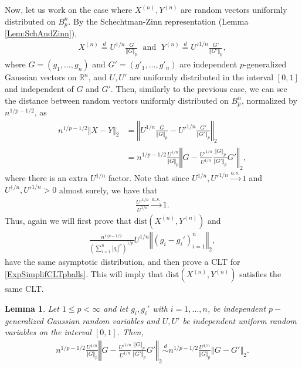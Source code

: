 \documentclass[10pt]{amsart}
\newtheorem{lemma}{Lemma}[section]
\newcounter{theor}
\def\R{\mathbb{R}}
\def\dist{\text{dist}}
\numberwithin{equation}{section}
\begin{document}
Now, let us work on the case where $X^{(n)},Y^{(n)}$ are random vectors uniformly distributed on $B_p^n$. By the Schechtman-Zinn representation (Lemma \ref{Lem:SchAndZinn}), 
\begin{align*}
X^{(n)} \overset{d}{=} U^{1/n} \frac{G}{\Vert G \Vert _p} \; \text{ and } \; Y^{(n)} \overset{d}{=} U'^{1/n} \frac{G'}{\Vert G' \Vert _p},
\end{align*}
where $G=(g_1,...,g_n)$ and $G'=(g'_1,...,g'_n)$ are independent $p$-generalized Gaussian vectors on $\R^n$, and $U,U'$ are uniformly distributed in the interval $[0,1]$ and independent of $G$ and $G'$.
Then, similarly to the previous case, we can see the distance between random vectors uniformly distributed on $B_p^n$, normalized by $n^{1/p - 1/2}$, as
\begin{align*}
n^{1/p - 1/2}\Vert X - Y \Vert _2 & = \left\Vert U^{1/n} \frac{G}{\Vert G \Vert_p} -U'^{1/n} \frac{G'}{\Vert G' \Vert_p} \right\Vert _2 
 \\
 & = n^{1/p - 1/2} \frac{U^{1/n}}{\Vert G \Vert _p} \left\Vert G-  \frac{U'^{1/n}}{U^{1/n}} \frac{\Vert G \Vert_p}{\Vert G' \Vert_p} G' \right\Vert _2 ,
\end{align*}
where there is an extra $U^{1/n}$ factor.
Note that since $U^{1/n}, U'^{1/n} \overset{a.s.}{\to} 1$ and $U^{1/n}, U'^{1/n}>0$ almost surely, we have that
\begin{align*}
\frac{U'^{1/n}}{U^{1/n}} \overset{a.s.}{\to} 1 .
\end{align*}
Thus, again we will first prove that $\dist( X^{(n)} , Y^{(n)} )$ and 
\begin{align}
\label{ExpSimplifCLTpballs}
\frac{n^{1/p-1/2}}{\left(\sum _{i=1}^n \left| g_i  \right|^p \right)^{1/p}} U^{1/n} \left\Vert   \left( g_i -  g_i' \right)_{i=1}^n \right\Vert _2,
\end{align}
have the same asymptotic distribution, and then prove a CLT for \eqref{ExpSimplifCLTpballs}. This will imply that $\dist(X^{(n)} , Y^{(n)})$ satisfies the same CLT.


\begin{lemma}
\label{LemEquivalentCLTpball}
Let $1\leq p <\infty$ and let $g_i, g_i'$ with $i=1,...,n$, be independent $p-$generalized Gaussian random variables and $U,U'$ be independent uniform random variables on the interval $[0,1]$. Then,
\begin{align*}
n^{1/p - 1/2} \frac{U^{1/n}}{\Vert G \Vert _p} \left\Vert G-  \frac{U'^{1/n}}{U^{1/n}} \frac{\Vert G \Vert_p}{\Vert G' \Vert_p} G' \right\Vert _2 \overset{d}{\sim} n^{1/p - 1/2} \frac{U^{1/n}}{\Vert G \Vert _p} \left\Vert G-  G' \right\Vert _2 .
\end{align*}
\end{lemma}
\end{document}
